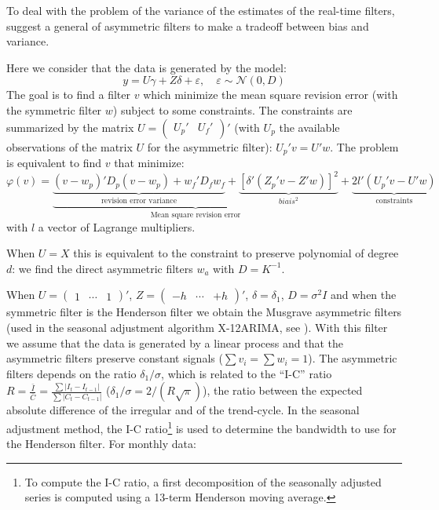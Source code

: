 \documentclass[
  12pt,
  ,
  a4paper]{article}
\newcommand\1{\mathds{1}}
\begin{document}
To deal with the problem of the variance of the estimates of the real-time filters, \textcite{proietti2008} suggest a general of asymmetric filters to make a tradeoff between bias and variance.

Here we consider that the data is generated by the model:
\[
y=U\gamma+Z\delta+\varepsilon,\quad
\varepsilon\sim\mathcal{N}(0,D)
\]
The goal is to find a filter \(v\) which minimize the mean square revision error (with the symmetric filter \(w\)) subject to some constraints.
The constraints are summarized by the matrix \(U=\begin{pmatrix}U_{p}'&U_{f}'\end{pmatrix}'\) (with \(U_p\) the available observations of the matrix \(U\) for the asymmetric filter): \(U_p'v=U'w\).
The problem is equivalent to find \(v\) that minimize:
\begin{equation}
\varphi(v)=
\underbrace{
  \underbrace{(v-w_{p})'D_{p}(v-w_{p})+
  w_{f}'D_{f}w_{f}}_\text{revision error variance}+
  \underbrace{[\delta'(Z_{p}'v-Z'w)]^{2}}_{biais^2}
}_\text{Mean square revision error}+
\underbrace{2l'(U_{p}'v-U'w)}_{\text{constraints}}
\label{eq:lppasym}
\end{equation}
with \(l\) a vector of Lagrange multipliers.

When \(U=X\) this is equivalent to the constraint to preserve polynomial of degree \(d\): we find the direct asymmetric filters \(w_a\) with \(D=K^{-1}\).

When \(U=\begin{pmatrix}1&\cdots&1\end{pmatrix}'\), \(Z=\begin{pmatrix}-h&\cdots&+h\end{pmatrix}'\), \(\delta=\delta_1\), \(D=\sigma^2I\) and when the symmetric filter is the Henderson filter we obtain the Musgrave asymmetric filters (used in the seasonal adjustment algorithm X-12ARIMA, see \textcite{musgrave1964set}).
With this filter we assume that the data is generated by a linear process and that the asymmetric filters preserve constant signals (\(\sum v_i=\sum w_i=1\)).
The asymmetric filters depends on the ratio \(\delta_1/\sigma\), which is related to the ``I-C'' ratio \(R=\frac{\bar{I}}{\bar{C}}=\frac{\sum\lvert I_t-I_{t-1}\rvert}{\sum\lvert C_t-C_{t-1}\rvert}\) (\(\delta_1/\sigma=2/(R\sqrt{\pi})\)), the ratio between the expected absolute difference of the irregular and of the trend-cycle.
In the seasonal adjustment method, the I-C ratio\footnote{To compute the I-C ratio, a first decomposition of the seasonally adjusted series is computed using a 13-term Henderson moving average.} is used to determine the bandwidth to use for the Henderson filter. For monthly data:
\end{document}
